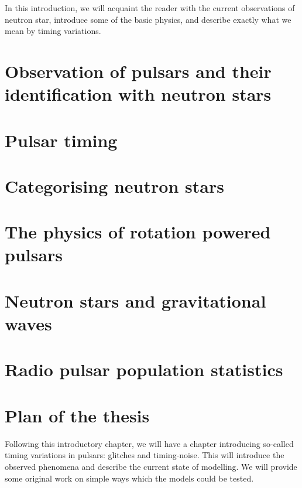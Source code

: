 \documentclass[../full_thesis/full_thesis.tex]{subfiles}
\newcommand{\thisdir}{../introduction}
\begin{document}
In this introduction, we will acquaint the reader with the current observations
of neutron star, introduce some of the basic physics, and describe exactly what
we mean by timing variations.

\section{Observation of pulsars and their identification with neutron stars}


\section{Pulsar timing}
\label{sec: pulsar timing methods}


\section{Categorising neutron stars}
\label{sec: categorising neutron stars}


\section{The physics of rotation powered pulsars} 
\label{sec: rotation powered pulsars}


\section{Neutron stars and gravitational waves}
\label{sec: gravitational waves}


\section{Radio pulsar population statistics}
\label{sec: population stats}



\section{Plan of the thesis}

Following this introductory chapter, we will have a chapter introducing
so-called timing variations in pulsars: glitches and timing-noise. This will
introduce the observed phenomena and describe the current state of modelling.
We will provide some original work on simple ways which the models could be
tested.
\end{document}
